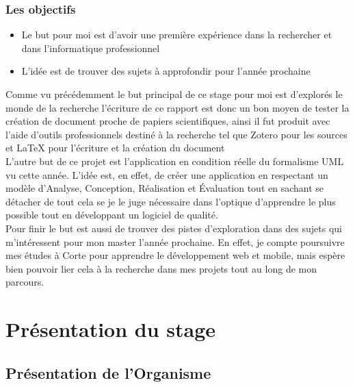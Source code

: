 \documentclass{rapport_stage}
\begin{document}
\section*{Les objectifs}

\begin{itemize}[label=$\bullet$]
  \item Le but pour moi est d'avoir une première expérience dans la rechercher et dans l'informatique professionnel
  \item L'idée est de trouver des sujets à approfondir pour l'année prochaine
\end{itemize}

Comme vu précédemment le but principal de ce stage pour moi est d'explorés le monde de la recherche
l'écriture de ce rapport est donc un bon moyen de tester la création de document proche de papiers
scientifiques, ainsi il fut produit avec l'aide d'outils professionnels destiné à la recherche
tel que Zotero pour les sources et LaTeX pour l'écriture et la création du document \\

L'autre but de ce projet est l'application en condition réelle du formalisme UML vu cette année.
L'idée est, en effet, de créer une application en respectant un modèle d'Analyse, Conception,
Réalisation et Évaluation tout en sachant se détacher de tout cela se je le juge nécessaire dans
l'optique d'apprendre le plus possible tout en développant un logiciel de qualité. \\

Pour finir le but est aussi de trouver des pistes d'exploration dans des sujets qui m'intéressent
pour mon master l'année prochaine. En effet, je compte poursuivre mes études à Corte pour apprendre
le développement web et mobile, mais espère bien pouvoir lier cela à la recherche dans mes projets
tout au long de mon parcours.

\cleardoublepage





\part{Présentation du stage}

\chapter{Présentation de l'Organisme}
\end{document}
